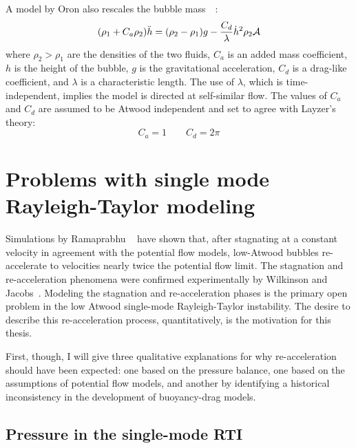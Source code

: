 A model by Oron \etal also rescales the bubble mass~~\cite{Oron2001}:
\begin{equation} \elabel{buoyancy_drag}
(\rho_1 + C_a \rho_2) \ddot{h} = (\rho_2 - \rho_1)g - \frac{C_d}{\lambda} \dot{h}^2 \rho_2 \mathcal{A}
\end{equation}
where $\rho_2 > \rho_1$ are the densities of the two fluids, 
$C_a$ is an added mass coefficient,
$h$ is the height of the bubble,
$g$ is the gravitational acceleration,
$C_d$ is a drag-like coefficient, and
$\lambda$ is a characteristic length.
The use of $\lambda$, which is time-independent, implies the model is directed at self-similar flow.
The values of $C_a$ and $C_d$ are assumed to be Atwood independent and set to agree with Layzer's theory:
\begin{equation}
C_a = 1 \qquad C_d = 2\pi
\end{equation}

\section{Problems with single mode Rayleigh-Taylor modeling}

Simulations by Ramaprabhu \etal ~\cite{Ramaprabhu2006} have shown that, after stagnating at a constant velocity in agreement with the potential flow models, low-Atwood bubbles re-accelerate to velocities nearly twice the potential flow limit.
The stagnation and re-acceleration phenomena were confirmed experimentally by Wilkinson and Jacobs~\cite{Wilkinson2007}.
Modeling the stagnation and re-acceleration phases is the primary open problem in the low Atwood single-mode Rayleigh-Taylor instability.
The desire to describe this re-acceleration process, quantitatively, is the motivation for this thesis.

First, though, I will give three qualitative explanations for why re-acceleration should have been expected: one based on the pressure balance, one based on the assumptions of potential flow models, and another by identifying a historical inconsistency in the development of buoyancy-drag models.

\subsection{Pressure in the single-mode RTI}

